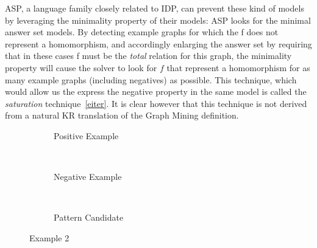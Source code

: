 ASP, a language family closely related to IDP, can prevent these kind of models by leveraging the minimality property of their models: ASP looks for the minimal answer set models.
By detecting example graphs for which the f does not represent a homomorphism, and %
accordingly enlarging the answer set by requiring that in these cases f must be the \emph{total} relation for this graph, the minimality property will cause the solver to look for $f$ that represent a homomorphism for as many example graphs (including negatives) as possible.
This technique, which would allow us the express the negative property in the same model is called the \emph{saturation} technique~\ref{eiter}.
It is clear however that this technique is not derived from a natural KR translation of the Graph Mining definition.
\begin{figure}
  \centering
  \begin{subfigure}[b]{0.3\textwidth}
    \centering
    \caption{Positive Example}
  \end{subfigure}
  ~
  \begin{subfigure}[b]{0.3\textwidth}
    \centering
    \caption{Negative Example}
  \end{subfigure}
  ~
  \begin{subfigure}[b]{0.3\textwidth}
      \centering
      \caption{Pattern Candidate}
  \end{subfigure}
  \caption{Example 2\label{fig:ex2}}
\end{figure}

